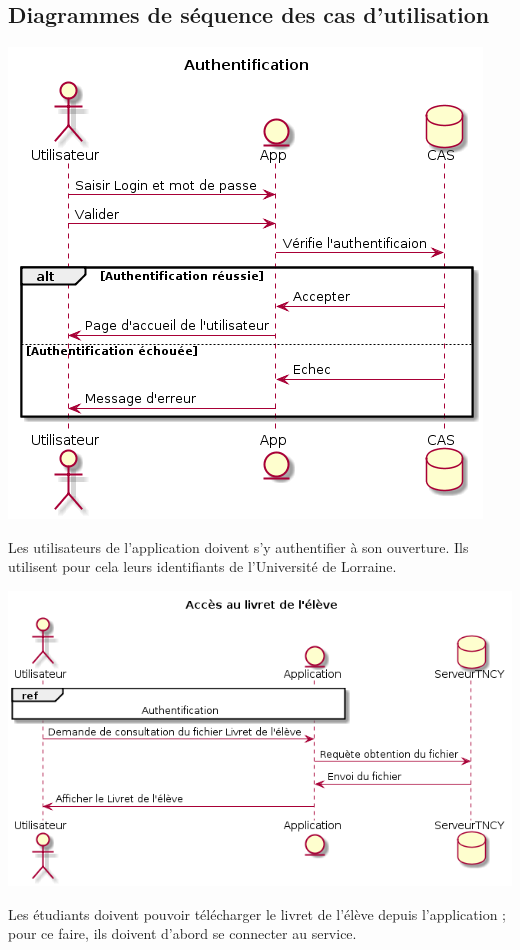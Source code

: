 \documentclass{scrreprt}
\begin{document}
\subsection{Diagrammes de séquence des cas d'utilisation}
\begin{center}
	\includegraphics[scale=0.55]{image/authentification.png}
\end{center}
\hspace{1cm}Les utilisateurs de l'application doivent s'y authentifier à son ouverture. Ils utilisent pour cela leurs identifiants de l'Université de Lorraine.

\begin{center}
	\includegraphics[scale=0.55]{image/accesLivretEleve.png}
\end{center}
\hspace{1cm}Les étudiants doivent pouvoir télécharger le livret de l'élève depuis l'application ; pour ce faire, ils doivent d'abord se connecter au service.
\end{document}
